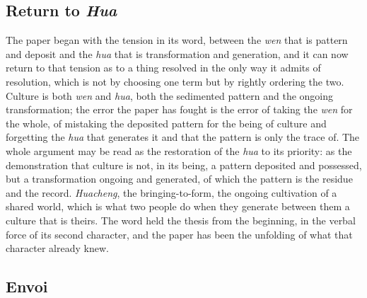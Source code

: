 \subsection*{Return to \emph{Hua}}

The paper began with the tension in its word, between the \emph{wen} that is pattern and deposit and the \emph{hua} that is transformation and generation, and it can now return to that tension as to a thing resolved in the only way it admits of resolution, which is not by choosing one term but by rightly ordering the two. Culture is both \emph{wen} and \emph{hua}, both the sedimented pattern and the ongoing transformation; the error the paper has fought is the error of taking the \emph{wen} for the whole, of mistaking the deposited pattern for the being of culture and forgetting the \emph{hua} that generates it and that the pattern is only the trace of. The whole argument may be read as the restoration of the \emph{hua} to its priority: as the demonstration that culture is not, in its being, a pattern deposited and possessed, but a transformation ongoing and generated, of which the pattern is the residue and the record. \emph{Huacheng}, the bringing-to-form, the ongoing cultivation of a shared world, which is what two people do when they generate between them a culture that is theirs. The word held the thesis from the beginning, in the verbal force of its second character, and the paper has been the unfolding of what that character already knew.

\subsection*{Envoi}

